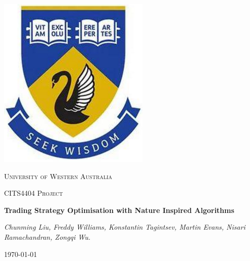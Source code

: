 \begin{titlepage}


\thispagestyle{empty}
\setlength\headheight{0pt} 
\begin{center}

\begin{center}
\includegraphics[width=0.25\linewidth]{img/uwa.PNG}            
\end{center}	

        \vspace{0.25cm}
        {\scshape\LARGE University of Western Australia \par}
        \vspace{0.25cm}
        {\scshape\Large CITS4404 Project \par}
        \vspace{0.5cm}

        {\Large\bfseries Trading Strategy Optimisation with Nature Inspired Algorithms \par}
        
        \vspace{0.5cm}
        {\small\itshape Chunming Liu, Freddy Williams, Konstantin Tagintsev, Martin Evans, 
        Nisari Ramachandran, Zongqi Wu.
         \par}
        \vspace{0.25cm}

\vspace{1cm}
\large
\today

\end{center}

\clearpage
\restoregeometry
\end{titlepage}
